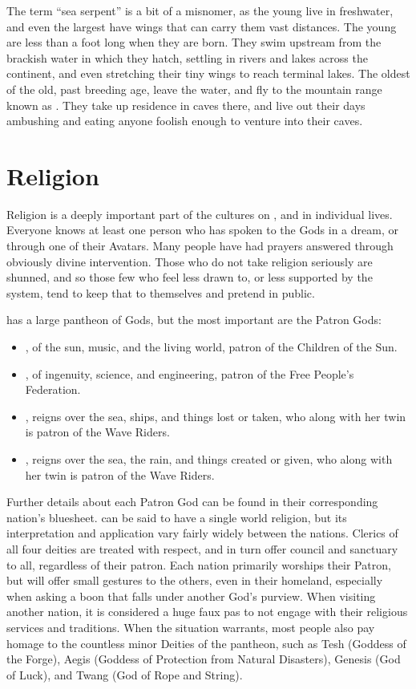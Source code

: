 \documentclass[blue]{GL2020}
\begin{document}
The term ``sea serpent'' is a bit of a misnomer, as the young live in freshwater, and even the largest have wings that can carry them vast distances. The young are less than a foot long when they are born. They swim upstream from the brackish water in which they hatch, settling in rivers and lakes across the continent, and even stretching their tiny wings to reach terminal lakes. The oldest of the old, past breeding age, leave the water, and fly to the mountain range known as \pSpine{}. They take up residence in caves there, and live out their days ambushing and eating anyone foolish enough to venture into their caves.

\section*{Religion}
Religion is a deeply important part of the cultures on \pEarth{}, and in individual lives. Everyone knows at least one person who has spoken to the Gods in a dream, or through one of their Avatars. Many people have had prayers answered through obviously divine intervention. Those who do not take religion seriously are shunned, and so those few who feel less drawn to, or less supported by the system, tend to keep that to themselves and pretend in public.

\pEarth{} has a large pantheon of Gods, but the most important are the Patron Gods: 
\begin{itemize}
	\item \cFarmGod{}, \cFarmGod{\God} of the sun, music, and the living world, patron of the Children of the Sun.
	\item \cTechGod{}, \cTechGod{\God} of ingenuity, science, and engineering, patron of the Free People's Federation.
	\item \cEbbFull{\full}, reigns over the sea, ships, and things lost or taken, who along with her twin 	\cFlowFull{} is patron of the Wave Riders.
	\item \cFlowFull{\full}, reigns over the sea, the rain, and things created or given, who along with her twin \cEbbFull{} is patron of the Wave Riders.
\end{itemize}

Further details about each Patron God can be found in their corresponding nation's bluesheet. \pEarth{} can be said to have a single world religion, but its interpretation and application vary fairly widely between the nations. Clerics of all four deities are treated with respect, and in turn offer council and sanctuary to all, regardless of their patron. Each nation primarily worships their Patron, but will offer small gestures to the others, even in their homeland, especially when asking a boon that falls under another God's purview. When visiting another nation, it is considered a huge faux pas to not engage with their religious services and traditions. When the situation warrants, most people also pay homage to the countless minor Deities of the pantheon, such as Tesh (Goddess of the Forge), Aegis (Goddess of Protection from Natural Disasters), Genesis (God of Luck), and Twang (God of Rope and String).
\end{document}
